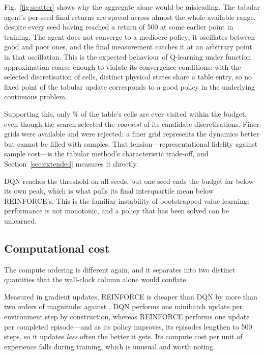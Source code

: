 \documentclass[conference]{IEEEtran}
\begin{document}
Fig.~\ref{fig:scatter} shows why the aggregate alone would be misleading. The
tabular agent's per-seed final returns are spread across almost the whole
available range, despite every seed having reached a return of 500 at some earlier
point in training. The agent does not converge to a mediocre policy; it oscillates
between good and poor ones, and the final measurement catches it at an arbitrary
point in that oscillation. This is the expected behaviour of Q-learning under
function approximation coarse enough to violate its convergence conditions: with
the selected discretisation of \TabCells{} cells, distinct physical states share a
table entry, so no fixed point of the tabular update corresponds to a good policy
in the underlying continuous problem.

Supporting this, only \TabCoverage{}\% of the table's cells are ever visited
within the budget, even though the search selected the \emph{coarsest} of its
candidate discretisations. Finer grids were available and were rejected: a finer
grid represents the dynamics better but cannot be filled with \StepBudget{}
samples. That tension---representational fidelity against sample cost---is the
tabular method's characteristic trade-off, and Section~\ref{sec:extended}
measures it directly.

DQN reaches the threshold on all \NumSeeds{} seeds, but one seed ends the budget
far below its own peak, which is what pulls its final interquartile mean below
REINFORCE's. This is the familiar instability of bootstrapped value learning:
performance is not monotonic, and a policy that has been solved can be unlearned.

\subsection{Computational cost}

The compute ordering is different again, and it separates into two distinct
quantities that the wall-clock column alone would conflate.

Measured in gradient updates, REINFORCE is cheaper than DQN by more than two
orders of magnitude: \ReiUpdates{} against \DqnUpdates{}. DQN performs one
minibatch update per environment step by construction, whereas REINFORCE performs
one update per completed episode---and as its policy improves, its episodes
lengthen to 500 steps, so it updates \emph{less} often the better it gets. Its
compute cost per unit of experience falls during training, which is unusual and
worth noting.
\end{document}
